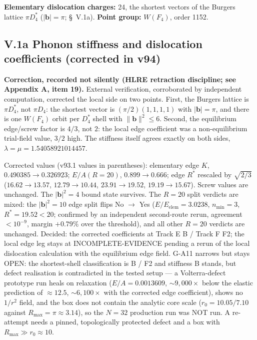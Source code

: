 \documentclass[a4paper,11pt]{article}
\begin{document}
\textbf{Elementary dislocation charges:} 24, the shortest vectors of the Burgers lattice $\pi D_4^*$ ($|\mathbf{b}|=\pi$; \S~V.1a). \textbf{Point group:} $W(F_4)$, order 1152.

\subsection*{V.1a Phonon stiffness and dislocation coefficients (corrected in v94)}

\textbf{Correction, recorded not silently (HLRE retraction discipline; see Appendix A, item 19).} External verification, corroborated by independent computation, corrected the local side on two points. First, the Burgers lattice is $\pi D_4^*$, not $\pi D_4$: the shortest vector is $(\pi/2)(1,1,1,1)$ with $|\mathbf{b}|=\pi$, and there is one $W(F_4)$ orbit per $D_4^*$ shell with $\lVert\mathbf{b}\rVert^2\le6$. Second, the equilibrium edge/screw factor is $4/3$, not $2$: the local edge coefficient was a non-equilibrium trial-field value, $3/2$ high. The stiffness itself agrees exactly on both sides, $\lambda=\mu=1.54058921014457$.

Corrected values (v93.1 values in parentheses): elementary edge $K$, $0.490385\to0.326923$; $E/A(R=20)$, $0.899\to0.666$; edge $R^*$ rescaled by $\sqrt{2/3}$ ($16.62\to13.57$, $12.79\to10.44$, $23.91\to19.52$, $19.19\to15.67$). Screw values are unchanged. The $|\mathbf{b}|^2=4$ bound state survives. The $R=20$ split verdicts are mixed: the $|\mathbf{b}|^2=10$ edge split flips No $\to$ Yes ($E/E_{\mathrm{elem}}=3.0238$, $n_{\min}=3$, $R^*=19.52<20$; confirmed by an independent second-route rerun, agreement $<10^{-9}$, margin $+0.79\%$ over the threshold), and all other $R=20$ verdicts are unchanged. Decided: the corrected coefficients at Track E B / Track F F2; the local edge leg stays at INCOMPLETE-EVIDENCE pending a rerun of the local dislocation calculation with the equilibrium edge field. G-A11 narrows but stays OPEN: the shortest-shell classification is B / F2 and stiffness B stands, but defect realisation is contradicted in the tested setup --- a Volterra-defect prototype run heals on relaxation ($E/A=0.0013609$, $\sim9{,}000\times$ below the elastic prediction of $\approx12.5$, $\sim6{,}100\times$ with the corrected edge coefficient), shows no $1/r^2$ field, and the box does not contain the analytic core scale ($r_0=10.05/7.10$ against $R_{\max}=\pi\approx3.14$), so the $N=32$ production run was NOT run. A re-attempt needs a pinned, topologically protected defect and a box with $R_{\max}\gg r_0\approx10$.
\end{document}
